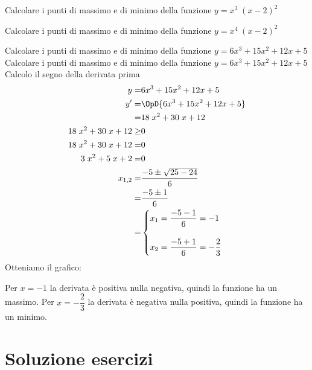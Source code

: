 \begin{exercise}[no solution]
	Calcolare i punti di massimo e di minimo della funzione $y=x^{3} \;  \left(x - 2 \right)^{2}$
\end{exercise}
\begin{exercise}[no solution]
	Calcolare i punti di massimo e di minimo della funzione $y=x^{4} \;  \left(x - 2 \right)^{2}$
\end{exercise}
\begin{exercise}
Calcolare i punti di massimo e di minimo della funzione $y=6x^3+15x^2+12x+5$
	\tcblower
Calcolare i punti di massimo e di minimo della funzione $y=6x^3+15x^2+12x+5$
Calcolo il segno della derivata prima
\begin{align*}
y=&6x^3+15x^2+12x+5\\
y'=&\OpD{6x^3+15x^2+12x+5}\\
=&18 \; x^{2} + 30 \; x + 12\\
18 \; x^{2} + 30 \; x + 12\geq&0\\
18 \; x^{2} + 30 \; x + 12=&0\\
3 \; x^{2} + 5 \; x + 2=&0\\
x_{1,2}=&\dfrac{-5\pm\sqrt{25-24}}{6}\\
=&\dfrac{-5\pm 1}{6}\\
=&\begin{cases}
x_1=\dfrac{-5-1}{6}=-1\\
\\
x_2=\dfrac{-5+1}{6}=-\dfrac{2}{3}\\
\end{cases}
\end{align*}
	Otteniamo il grafico:
\begin{center}
	
\end{center}
Per $x=-1$ la derivata è positiva nulla negativa, quindi la funzione ha un massimo. Per $x=-\dfrac{2}{3}$ la derivata è negativa nulla positiva, quindi la funzione ha un minimo. 
\end{exercise}
\tcbstoprecording
\newpage
\section{Soluzione esercizi}
\tcbinputrecords
\newpage
